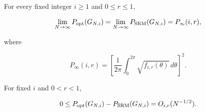 \begin{theorem}\label{thm:fixed-length}
For every fixed integer \(i\ge1\) and \(0\le r\le1\),

\begin{equation}\label{eq:fixed-limit}
\lim_{N\to\infty}P_{\rm opt}(G_{N,i})
=\lim_{N\to\infty}P_{\rm SRM}(G_{N,i})
=P_\infty(i,r),
\end{equation}

where

\begin{equation}\label{eq:fixed-integral}
P_\infty(i,r)
=\left[
\frac1{2\pi}\int_0^{2\pi}\sqrt{f_{i,r}(\theta)}\,d\theta
\right]^2.
\end{equation}

For fixed \(i\) and \(0<r<1\),

\begin{equation}\label{eq:fixed-gap-rate}
0\le P_{\rm opt}(G_{N,i})-P_{\rm SRM}(G_{N,i})
=O_{i,r}(N^{-1/2}).
\end{equation}
\end{theorem}

